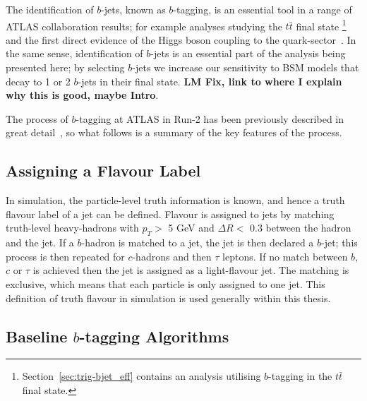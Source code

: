 The identification of $b$-jets, known as $b$-tagging, is an essential tool in a range of ATLAS collaboration results;
for example analyses studying the $t\bar{t}$ final state \cite{obj-ttbar}
\footnote{Section~\ref{sec:trig-bjet_eff} contains an analysis utilising $b$-tagging in the $t\bar{t}$ final state.}
and the first direct evidence of the Higgs boson coupling to the quark-sector~\cite{obj-Hbb}.
In the same sense, identification of $b$-jets is an essential part of the analysis being presented here;
by selecting $b$-jets we increase our sensitivity to BSM models that decay to 1 or 2 $b$-jets in their final state.
\textbf{LM Fix, link to where I explain why this is good, maybe Intro}.

The process of $b$-tagging at ATLAS in Run-2 has been previously described in great
detail~\cite{obj-bjets_algo_2015,obj-bjets_algo_2016},
so what follows is a summary of the key features of the process.

\subsection{Assigning a Flavour Label}
\label{sec:obj-bjets_label}

In simulation, the particle-level truth information is known, and hence a truth flavour label of a jet can be defined.
Flavour is assigned to jets by matching truth-level heavy-hadrons with $p_{T} >$ 5 GeV and $\Delta R <$ 0.3 between the hadron and the jet.
If a $b$-hadron is matched to a jet, the jet is then declared a $b$-jet;
this process is then repeated for $c$-hadrons and then $\tau$ leptons.
If no match between $b$, $c$ or $\tau$ is achieved then the jet is assigned as a light-flavour jet.
The matching is exclusive, which means that each particle is only assigned to one jet.
This definition of truth flavour in simulation is used generally within this thesis.
   
\subsection{Baseline $b$-tagging Algorithms}

